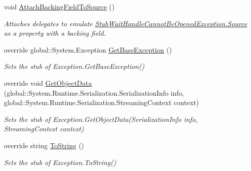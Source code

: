 \begin{DoxyCompactItemize}
void \hyperlink{class_system_1_1_threading_1_1_fakes_1_1_stub_wait_handle_cannot_be_opened_exception_ad7403e6f92e0fc9d337ad58f00a9e4b4}{Attach\-Backing\-Field\-To\-Source} ()
\begin{DoxyCompactList}\small\item\em Attaches delegates to emulate \hyperlink{class_system_1_1_threading_1_1_fakes_1_1_stub_wait_handle_cannot_be_opened_exception_aecb33f22e34ecd9119660a2fd4607fcb}{Stub\-Wait\-Handle\-Cannot\-Be\-Opened\-Exception.\-Source} as a property with a backing field.\end{DoxyCompactList}\item 
override global\-::\-System.\-Exception \hyperlink{class_system_1_1_threading_1_1_fakes_1_1_stub_wait_handle_cannot_be_opened_exception_a9f7fff62dcca3ddf22e931e4d4e2e66b}{Get\-Base\-Exception} ()
\begin{DoxyCompactList}\small\item\em Sets the stub of Exception.\-Get\-Base\-Exception()\end{DoxyCompactList}\item 
override void \hyperlink{class_system_1_1_threading_1_1_fakes_1_1_stub_wait_handle_cannot_be_opened_exception_a5e3360185413d02338813bcf280bdc3f}{Get\-Object\-Data} (global\-::\-System.\-Runtime.\-Serialization.\-Serialization\-Info info, global\-::\-System.\-Runtime.\-Serialization.\-Streaming\-Context context)
\begin{DoxyCompactList}\small\item\em Sets the stub of Exception.\-Get\-Object\-Data(\-Serialization\-Info info, Streaming\-Context context)\end{DoxyCompactList}\item 
override string \hyperlink{class_system_1_1_threading_1_1_fakes_1_1_stub_wait_handle_cannot_be_opened_exception_aea37ed50091e9975f2fe689105780d8e}{To\-String} ()
\begin{DoxyCompactList}\small\item\em Sets the stub of Exception.\-To\-String()\end{DoxyCompactList}\end{DoxyCompactItemize}
